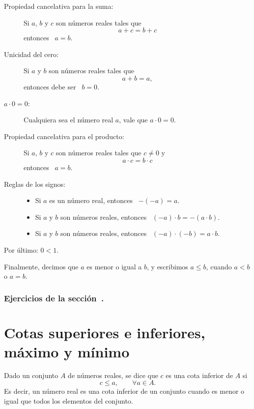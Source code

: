 \begin{description}
    \item[Propiedad cancelativa para la suma:] Si $a$, $b$ y $c$ son números reales tales que
    \[ a+c = b+c\]
    entonces \ $a=b$.

    \item[Unicidad del cero:] Si $a$ y $b$ son números reales tales que
    \[a+b=a,\]
    entonces debe ser \ $b=0$.

    \item[$a\cdot 0 = 0$:] Cualquiera sea el número real $a$, vale que $a\cdot 0 = 0$.

    \item[Propiedad cancelativa para el producto:] Si $a$, $b$ y $c$ son números reales tales que $c\neq 0$ y
    \[ a\cdot c = b \cdot c\]
    entonces \ $a=b$.

    \item[Reglas de los signos:]
    \begin{itemize}
        \item Si $a$ es un número real, entonces \ $-(-a) = a$.
        \item Si $a$ y $b$ son números reales, entonces \ $(-a)\cdot b = -(a\cdot b)$.
        \item Si $a$ y $b$ son números reales, entonces \ $(-a)\cdot (-b) = a\cdot b$.
    \end{itemize}

    \item[Por último: $0<1$.]
\end{description}

Finalmente, decimos que $a$ es menor o igual a $b$, y escribimos $a\le b$, cuando $a<b$ o $a=b$.

\subsubsection*{Ejercicios de la sección~.}

\begin{enumerate}
    
\end{enumerate}

\section{Cotas superiores e inferiores, máximo y mínimo}

\begin{definition}
    Dado un conjunto $A$ de números reales, se dice que $c$ es una cota inferior de $A$ si
    \[
    c \le a,\qquad \forall a\in A.
    \]
    Es decir, un número real es una cota inferior de un conjunto cuando es menor o igual que todos los elementos del conjunto.
\end{definition}

